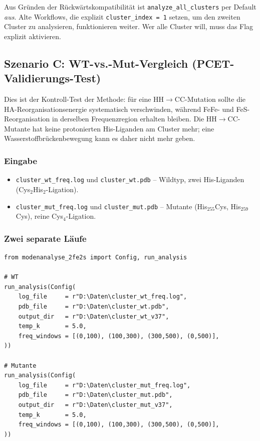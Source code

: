 \documentclass[11pt,a4paper,twoside]{article}
\theoremstyle{remark}
\begin{document}
Aus Gr\"unden der R\"uckw\"artskompatibilit\"at ist
\texttt{analyze\_all\_clusters} per Default \emph{aus}. Alte
Workflows, die explizit \texttt{cluster\_index = 1} setzen, um den
zweiten Cluster zu analysieren, funktionieren weiter. Wer alle
Cluster will, muss das Flag explizit aktivieren.

\subsection{Szenario C: WT-vs.-Mut-Vergleich (PCET-Validierungs-Test)}
\label{sec:workflow-wtmut}

Dies ist der Kontroll-Test der Methode: f\"ur eine HH$\to$CC-Mutation
sollte die HA-Reorganisationsenergie systematisch verschwinden,
w\"ahrend FeFe- und FeS-Reorganisation in derselben Frequenzregion
erhalten bleiben. Die HH$\to$CC-Mutante hat keine protonierten
His-Liganden am Cluster mehr; eine Wasserstoffbr\"uckenbewegung kann
es daher nicht mehr geben.

\subsubsection*{Eingabe}

\begin{itemize}
  \item \texttt{cluster\_wt\_freq.log} und \texttt{cluster\_wt.pdb} -- Wildtyp,
        zwei His-Liganden (Cys$_2$His$_2$-Ligation).
  \item \texttt{cluster\_mut\_freq.log} und \texttt{cluster\_mut.pdb} --
        Mutante (His$_{255}$Cys, His$_{259}$Cys), reine Cys$_4$-Ligation.
\end{itemize}

\subsubsection*{Zwei separate L\"aufe}

\begin{lstlisting}[style=python]
from modenanalyse_2fe2s import Config, run_analysis

# WT
run_analysis(Config(
    log_file     = r"D:\Daten\cluster_wt_freq.log",
    pdb_file     = r"D:\Daten\cluster_wt.pdb",
    output_dir   = r"D:\Daten\cluster_wt_v37",
    temp_k       = 5.0,
    freq_windows = [(0,100), (100,300), (300,500), (0,500)],
))

# Mutante
run_analysis(Config(
    log_file     = r"D:\Daten\cluster_mut_freq.log",
    pdb_file     = r"D:\Daten\cluster_mut.pdb",
    output_dir   = r"D:\Daten\cluster_mut_v37",
    temp_k       = 5.0,
    freq_windows = [(0,100), (100,300), (300,500), (0,500)],
))
\end{lstlisting}
\end{document}
